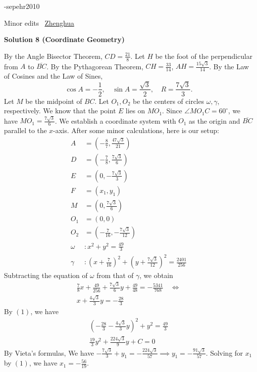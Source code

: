\begin{enumerate}
 -sepehr2010

 Minor edits ~\href{https://artofproblemsolving.com/wiki/index.php?title=Zhenghua}{Zhenghua}

 



\textbf{Solution 8 (Coordinate Geometry)}

By the Angle Bisector Theorem, $CD=\frac{21}{8}$. Let $H$ be the foot of the perpendicular from $A$ to $\overline{BC}$. By the Pythagorean Theorem, $CH=\frac{33}{14}$, $AH=\frac{15\sqrt{3}}{14}$. By the Law of Cosines and the Law of Sines, 
 \[\cos A=-\frac{1}{2},\quad \sin A=\frac{\sqrt{3}}{2},\quad R=\frac{7\sqrt{3}}{3}.\]  Let $M$ be the midpoint of $BC$. Let $O_1,O_2$ be the centers of circles $\omega,\gamma$, respectively. We know that the point $E$ lies on $MO_1$. Since $\angle MO_1C=60^\circ$, we have $MO_1=\frac{7\sqrt{3}}{6}$. We establish a coordinate system with $O_1$ as the origin and $\overline{BC}$ parallel to the $x$-axis. After some minor calculations, here is our setup:\begin{align*}A&=\left(-\frac{8}{7},\frac{47\sqrt{3}}{21}\right)\\D&=\left(-\frac{7}{8},\frac{7\sqrt{3}}{6}\right)\\E&=\left(0,-\frac{7\sqrt{3}}{3}\right)\\F&=(x_1,y_1)\\M&=\left(0,\frac{7\sqrt{3}}{6}\right)\\O_1&=(0,0)\\O_2&=\left(-\frac{7}{16},-\frac{7\sqrt{3}}{12}\right)\\\omega&: x^2+y^2=\frac{49}{3}\\\gamma&: \left(x+\frac{7}{16}\right)^2+\left(y+\frac{7\sqrt{3}}{12}\right)^2=\frac{2401}{256}\end{align*}
Subtracting the equation of $\omega$ from that of $\gamma$, we obtain\begin{gather*}\frac{7}{8}x+\frac{49}{256}+\frac{7\sqrt{3}}{6}y+\frac{49}{48}=-\frac{5341}{768}\quad \iff\\x+\frac{4\sqrt{3}}{3}y=-\frac{28}{3} \tag{1}\end{gather*}By $(1)$, we have\begin{gather*}\left(-\frac{28}{3}-\frac{4\sqrt{3}}{3}y\right)^2+y^2=\frac{49}{3}\\\frac{19}{3}y^2 + \frac{224\sqrt{3}}{9}y + C = 0\end{gather*}By Vieta's formulas, We have $-\frac{7\sqrt{3}}{3}+y_1 = -\frac{224\sqrt{3}}{57}\implies y_1=-\frac{91\sqrt{3}}{57}$. Solving for $x_1$ by $(1)$, we have $x_1=-\frac{56}{19}$.


\end{enumerate}
